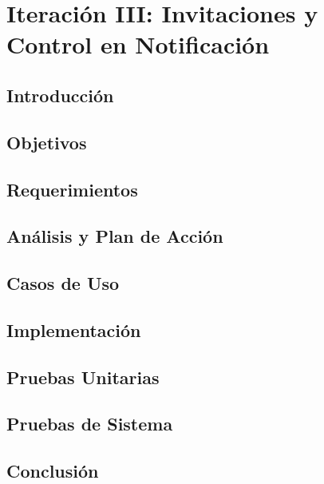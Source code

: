 \chapter{Iteración III:  Invitaciones y Control en Notificación} %

\label{Chapter8} %


\section{Introducción}
\section{Objetivos}
\section{Requerimientos}
\section{Análisis y Plan de Acción}
\section{Casos de Uso}
\section{Implementación}
\section{Pruebas Unitarias}
\section{Pruebas de Sistema}
\section{Conclusión}